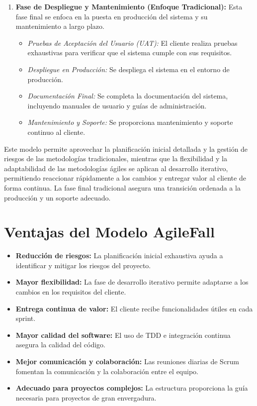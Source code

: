 \documentclass[12pt, spanish]{article}
\begin{document}
\begin{enumerate}
    \item \textbf{Fase de Despliegue y Mantenimiento (Enfoque Tradicional):} Esta fase final se enfoca en la puesta en producción del sistema y su mantenimiento a largo plazo.
    \begin{itemize}
        \item \textit{Pruebas de Aceptación del Usuario (UAT):} El cliente realiza pruebas exhaustivas para verificar que el sistema cumple con sus requisitos.
        \item \textit{Despliegue en Producción:} Se despliega el sistema en el entorno de producción.
        \item \textit{Documentación Final:} Se completa la documentación del sistema, incluyendo manuales de usuario y guías de administración.
        \item \textit{Mantenimiento y Soporte:} Se proporciona mantenimiento y soporte continuo al cliente.
    \end{itemize}
\end{enumerate}

Este modelo permite aprovechar la planificación inicial detallada y la gestión de riesgos de las metodologías tradicionales, mientras que la flexibilidad y la adaptabilidad de las metodologías ágiles se aplican al desarrollo iterativo, permitiendo reaccionar rápidamente a los cambios y entregar valor al cliente de forma continua.  La fase final tradicional asegura una transición ordenada a la producción y un soporte adecuado.

\section*{Ventajas del Modelo AgileFall}

\begin{itemize}
    \item \textbf{Reducción de riesgos:} La planificación inicial exhaustiva ayuda a identificar y mitigar los riesgos del proyecto.
    \item \textbf{Mayor flexibilidad:} La fase de desarrollo iterativo permite adaptarse a los cambios en los requisitos del cliente.
    \item \textbf{Entrega continua de valor:} El cliente recibe funcionalidades útiles en cada sprint.
    \item \textbf{Mayor calidad del software:} El uso de TDD e integración continua asegura la calidad del código.
    \item \textbf{Mejor comunicación y colaboración:} Las reuniones diarias de Scrum fomentan la comunicación y la colaboración entre el equipo.
    \item \textbf{Adecuado para proyectos complejos:} La estructura proporciona la guía necesaria para proyectos de gran envergadura.
\end{itemize}
\end{document}
